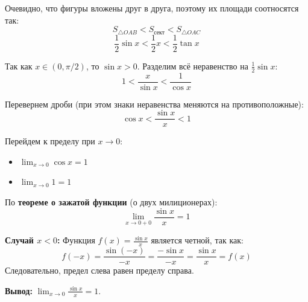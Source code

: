 \begin{tcolorbox}[title=Доказательство, breakable]
    Очевидно, что фигуры вложены друг в друга, поэтому их площади соотносятся так:
    \[ S_{\triangle OAB} < S_{\text{сект}} < S_{\triangle OAC} \]
    \[ \frac{1}{2} \sin x < \frac{1}{2} x < \frac{1}{2} \tan x \]
    
    Так как $x \in (0, \pi/2)$, то $\sin x > 0$. Разделим всё неравенство на $\frac{1}{2} \sin x$:
    \[ 1 < \frac{x}{\sin x} < \frac{1}{\cos x} \]
    
    Перевернем дроби (при этом знаки неравенства меняются на противоположные):
    \[ \cos x < \frac{\sin x}{x} < 1 \]
    
    Перейдем к пределу при $x \to 0$:
    \begin{itemize}
        \item $\lim_{x\to 0} \cos x = 1$
        \item $\lim_{x\to 0} 1 = 1$
    \end{itemize}
    
    По \textbf{теореме о зажатой функции} (о двух милиционерах):
    \[ \lim_{x \to 0+0} \frac{\sin x}{x} = 1 \]
    
    \textbf{Случай $x < 0$:}
    Функция $f(x) = \frac{\sin x}{x}$ является четной, так как:
    \[ f(-x) = \frac{\sin(-x)}{-x} = \frac{-\sin x}{-x} = \frac{\sin x}{x} = f(x) \]
    Следовательно, предел слева равен пределу справа.
    
    \textbf{Вывод:} $\lim_{x \to 0} \frac{\sin x}{x} = 1$.
\end{tcolorbox}

